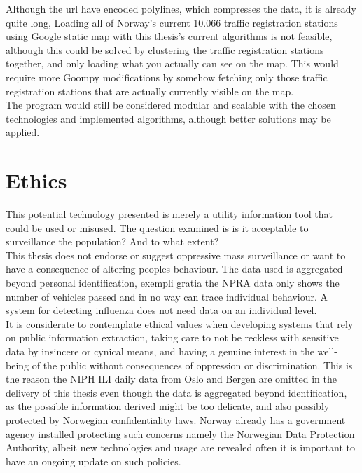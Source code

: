 Although the url have encoded polylines, which compresses the data, it is already quite long, Loading all of Norway's current 10.066 traffic registration stations using Google static map with this thesis's current algorithms is not feasible, although this could be solved by clustering the traffic registration stations together, and only loading what you actually can see on the map. This would require more Goompy modifications by somehow fetching only those traffic registration stations that are actually currently visible on the map.
\\
The program would still be considered modular and scalable with the chosen technologies and implemented algorithms, although better solutions may be applied.






\section{Ethics}
This potential technology presented is merely a utility information tool that could be used or misused. The question examined is is it acceptable to surveillance the population? And to what extent?
\\
This thesis does not endorse or suggest oppressive mass surveillance or want to have a consequence of altering peoples behaviour. The data used is aggregated beyond personal identification, exempli gratia the NPRA data only shows the number of vehicles passed and in no way can trace individual behaviour. A system for detecting influenza does not need data on an individual level. 
\\
It is considerate to contemplate ethical values when developing systems that rely on public information extraction, taking care to not be reckless with sensitive data by insincere or cynical means, and having a genuine interest in the well-being of the public without consequences of oppression or discrimination. This is the reason the NIPH ILI daily data from Oslo and Bergen are omitted in the delivery of this thesis even though the data is aggregated beyond identification, as the possible information derived might be too delicate, and also possibly protected by Norwegian confidentiality laws. Norway already has a government agency installed protecting such concerns namely the Norwegian Data Protection Authority\cite{datatilsynet}, albeit new technologies and usage are revealed often it is important to have an ongoing update on such policies.
\\

